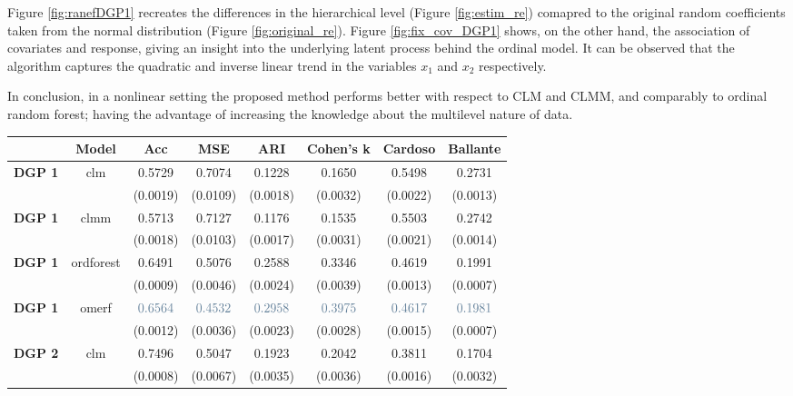 Figure \ref{fig:ranefDGP1} recreates the differences in the hierarchical level (Figure \ref{fig:estim_re}) comapred to the original random coefficients taken from the normal distribution (Figure \ref{fig:original_re}).
Figure \ref{fig:fix_cov_DGP1} shows, on the other hand, the association of covariates and response, giving an insight into the underlying latent process behind the ordinal model. It can be observed that the algorithm captures the quadratic and inverse linear trend in the variables \(x_1\) and \(x_2\) respectively.

In conclusion, in a nonlinear setting the proposed method performs better with respect to CLM and CLMM, and comparably to ordinal random forest; having the advantage of increasing the knowledge about the multilevel nature of data.

\begin{table}[H]
    \centering 
    \begin{tabular}{|p{4em} c c c c c c c |}
    \hline
    \rowcolor{bluePoli!40}
    & \textbf{Model} & \textbf{Acc} & \textbf{MSE} & \textbf{ARI} & \textbf{Cohen's k} & \textbf{Cardoso} & \textbf{Ballante} \T\B \\
    \hline \hline
    \textbf{DGP 1} & clm & 0.5729 & 0.7074 & 0.1228 & 0.1650 &  0.5498 & 0.2731 \T\B \\
    \textbf{} &  & (0.0019) & (0.0109) & (0.0018) & (0.0032) & (0.0022) & (0.0013) \T\B \\
    \textbf{DGP 1} & clmm & 0.5713 & 0.7127 & 0.1176 & 0.1535 &  0.5503 & 0.2742 \T\B \\
    \textbf{} &  & (0.0018) & (0.0103) & (0.0017) & (0.0031) & (0.0021) & (0.0014) \T\B \\
    \textbf{DGP 1} & ordforest & 0.6491 & 0.5076 & 0.2588 & 0.3346 & 0.4619 & 0.1991 \T\B \\
    \textbf{} &  & (0.0009) & (0.0046) & (0.0024) & (0.0039) & (0.0013) & (0.0007) \T\B \\
    \textbf{DGP 1} & omerf & $\textcolor{bluePoli}{0.6564}$ & $\textcolor{bluePoli}{0.4532}$ & $\textcolor{bluePoli}{0.2958}$ & $\textcolor{bluePoli}{0.3975}$ & $\textcolor{bluePoli}{0.4617}$ & $\textcolor{bluePoli}{0.1981}$ \T\B \\
    \textbf{} &  & (0.0012) & (0.0036) & (0.0023) & (0.0028) & (0.0015) & (0.0007) \T\B \\
    \hline
    \textbf{DGP 2} & clm & 0.7496 & 0.5047 & 0.1923 & 0.2042 & 0.3811 & 0.1704 \T\B \\
    \textbf{} &  & (0.0008) & (0.0067) & (0.0035) & (0.0036) & (0.0016) & (0.0032) \T\B \\

\end{tabular}
\end{table}

